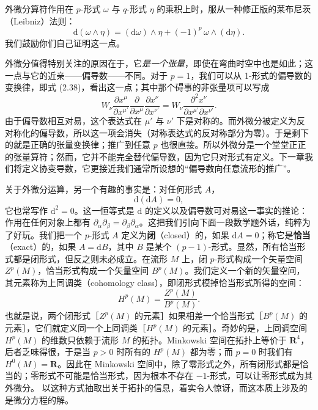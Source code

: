 外微分算符作用在 $p$-形式 $\omega$ 与 $q$-形式 $\eta$ 的乘积上时，服从一种修正版的莱布尼茨（Leibniz）法则：
\begin{equation*}
\mathrm{d}(\omega\wedge\eta)=(\mathrm{d}\omega)\wedge\eta+(-1)^{p}\,\omega\wedge(\mathrm{d}\eta). \tag{2.78}
\end{equation*}
我们鼓励你们自己证明这一点。

外微分值得特别关注的原因在于，它\emph{是一个张量}，即使在弯曲时空中也是如此；这一点与它的近亲——偏导数——不同。对于 $p=1$，我们可以从 1-形式的偏导数的变换律，即式 (2.38)，看出这一点；其中那个碍事的非张量项可以写成
\begin{equation*}
W_{\nu}\frac{\partial x^{\mu}}{\partial x^{\mu'}}\frac{\partial}{\partial x^{\mu}}\frac{\partial x^{\nu}}{\partial x^{\nu'}}=W_{\nu}\frac{\partial^{2}x^{\nu}}{\partial x^{\mu'}\partial x^{\nu'}}. \tag{2.79}
\end{equation*}
由于偏导数相互对易，这个表达式在 $\mu'$ 与 $\nu'$ 下是对称的。而外微分被定义为反对称化的偏导数，所以这一项会消失（对称表达式的反对称部分为零）。于是剩下的就是正确的张量变换律；推广到任意 $p$ 也很直接。所以外微分是一个堂堂正正的张量算符；然而，它并不能完全替代偏导数，因为它只对形式有定义。下一章我们将定义协变导数，它更接近我们通常所设想的“偏导数向任意流形的推广”。

关于外微分运算，另一个有趣的事实是：对任何形式 $A$，
\begin{equation*}
\mathrm{d}(\mathrm{d}A)=0, \tag{2.80}
\end{equation*}
它也常写作 $\mathrm{d}^{2}=0$。这一恒等式是 $\mathrm{d}$ 的定义以及偏导数可对易这一事实的推论：作用在任何对象上都有 $\partial_{\alpha}\partial_{\beta}=\partial_{\beta}\partial_{\alpha}$。这把我们引向下面一段数学题外话，纯粹为了好玩。我们把一个 $p$-形式 $A$ 定义为\textbf{闭}（closed）的，如果 $\mathrm{d}A=0$；称它是\textbf{恰当}（exact）的，如果 $A=\mathrm{d}B$，其中 $B$ 是某个 $(p-1)$-形式。显然，所有恰当形式都是闭形式，但反之则未必成立。在流形 $M$ 上，闭 $p$-形式构成一个矢量空间 $Z^{p}(M)$，恰当形式构成一个矢量空间 $B^{p}(M)$。我们定义一个新的矢量空间，其元素称为上同调类（cohomology class），即闭形式模掉恰当形式所得的空间：
\begin{equation*}
H^{p}(M)=\frac{Z^{p}(M)}{B^{p}(M)}. \tag{2.81}
\end{equation*}
也就是说，两个闭形式［$Z^{p}(M)$ 的元素］如果相差一个恰当形式［$B^{p}(M)$ 的元素］，它们就定义同一个上同调类［$H^{p}(M)$ 的元素］。奇妙的是，上同调空间 $H^{p}(M)$ 的维数只依赖于流形 $M$ 的拓扑。Minkowski 空间在拓扑上等价于 $\mathbf{R}^{4}$，后者乏味得很，于是当 $p>0$ 时所有的 $H^{p}(M)$ 都为零；而 $p=0$ 时我们有 $H^{0}(M)=\mathbf{R}$。因此在 Minkowski 空间中，除了零形式之外，所有闭形式都是恰当的；零形式不可能是恰当形式，因为根本不存在 $-1$-形式，可以让零形式成为其外微分。
以这种方式抽取出关于拓扑的信息，着实令人惊讶，而这本质上涉及的是微分方程的解。

